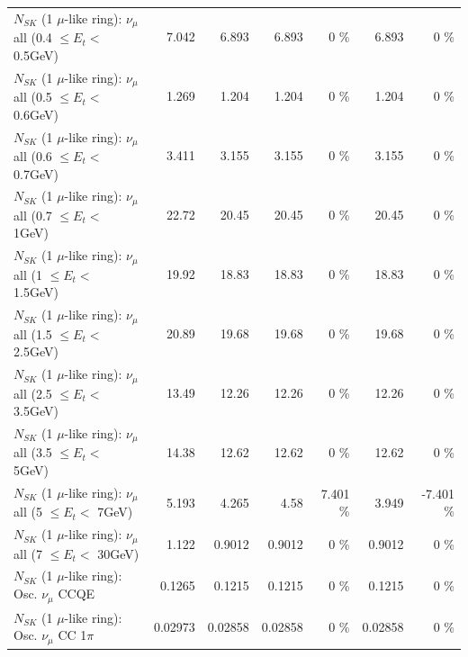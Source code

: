 \begin{table}
\begin{tabular}{| l | r | r | r  r | r  r |}
       $N_{SK}$ (1 $\mu$-like ring): $\nu_{\mu}$ all (0.4 $\leq E_{t} <$ 0.5GeV) &           7.042 &           6.893 &           6.893 &        0 \%  &           6.893 &        0 \%  \\ 
       $N_{SK}$ (1 $\mu$-like ring): $\nu_{\mu}$ all (0.5 $\leq E_{t} <$ 0.6GeV) &           1.269 &           1.204 &           1.204 &        0 \%  &           1.204 &        0 \%  \\ 
       $N_{SK}$ (1 $\mu$-like ring): $\nu_{\mu}$ all (0.6 $\leq E_{t} <$ 0.7GeV) &           3.411 &           3.155 &           3.155 &        0 \%  &           3.155 &        0 \%  \\ 
         $N_{SK}$ (1 $\mu$-like ring): $\nu_{\mu}$ all (0.7 $\leq E_{t} <$ 1GeV) &           22.72 &           20.45 &           20.45 &        0 \%  &           20.45 &        0 \%  \\ 
         $N_{SK}$ (1 $\mu$-like ring): $\nu_{\mu}$ all (1 $\leq E_{t} <$ 1.5GeV) &           19.92 &           18.83 &           18.83 &        0 \%  &           18.83 &        0 \%  \\ 
       $N_{SK}$ (1 $\mu$-like ring): $\nu_{\mu}$ all (1.5 $\leq E_{t} <$ 2.5GeV) &           20.89 &           19.68 &           19.68 &        0 \%  &           19.68 &        0 \%  \\ 
       $N_{SK}$ (1 $\mu$-like ring): $\nu_{\mu}$ all (2.5 $\leq E_{t} <$ 3.5GeV) &           13.49 &           12.26 &           12.26 &        0 \%  &           12.26 &        0 \%  \\ 
         $N_{SK}$ (1 $\mu$-like ring): $\nu_{\mu}$ all (3.5 $\leq E_{t} <$ 5GeV) &           14.38 &           12.62 &           12.62 &        0 \%  &           12.62 &        0 \%  \\ 
           $N_{SK}$ (1 $\mu$-like ring): $\nu_{\mu}$ all (5 $\leq E_{t} <$ 7GeV) &           5.193 &           4.265 &            4.58 &    7.401 \%  &           3.949 &   -7.401 \%  \\ 
          $N_{SK}$ (1 $\mu$-like ring): $\nu_{\mu}$ all (7 $\leq E_{t} <$ 30GeV) &           1.122 &          0.9012 &          0.9012 &        0 \%  &          0.9012 &        0 \%  \\ 
\hline
\hline
                               $N_{SK}$ (1 $\mu$-like ring): Osc. $\nu_\mu$ CCQE &          0.1265 &          0.1215 &          0.1215 &        0 \%  &          0.1215 &        0 \%  \\ 
                          $N_{SK}$ (1 $\mu$-like ring): Osc. $\nu_\mu$ CC 1$\pi$ &         0.02973 &         0.02858 &         0.02858 &        0 \%  &         0.02858 &        0 \%  \\ 

\end{tabular}
\end{table}
